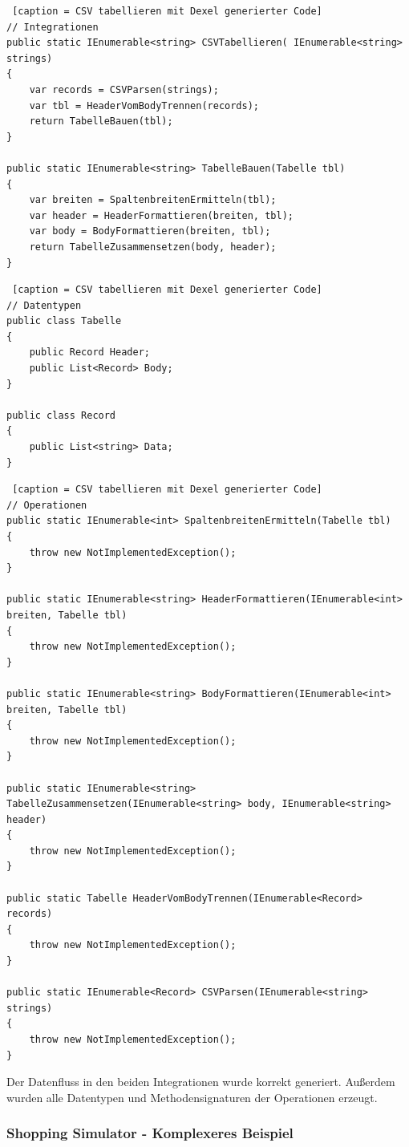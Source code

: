\begin{lstlisting} [caption = CSV tabellieren mit Dexel generierter Code]
// Integrationen
public static IEnumerable<string> CSVTabellieren( IEnumerable<string> strings)
{
	var records = CSVParsen(strings);
	var tbl = HeaderVomBodyTrennen(records);
	return TabelleBauen(tbl);
}

public static IEnumerable<string> TabelleBauen(Tabelle tbl)
{
	var breiten = SpaltenbreitenErmitteln(tbl);
	var header = HeaderFormattieren(breiten, tbl);
	var body = BodyFormattieren(breiten, tbl);
	return TabelleZusammensetzen(body, header);
}
\end{lstlisting}

\begin{lstlisting} [caption = CSV tabellieren mit Dexel generierter Code]
// Datentypen
public class Tabelle
{
	public Record Header;
	public List<Record> Body;
}

public class Record
{
	public List<string> Data;
}
\end{lstlisting}

\begin{lstlisting} [caption = CSV tabellieren mit Dexel generierter Code]
// Operationen
public static IEnumerable<int> SpaltenbreitenErmitteln(Tabelle tbl)
{
    throw new NotImplementedException();
}

public static IEnumerable<string> HeaderFormattieren(IEnumerable<int> breiten, Tabelle tbl)
{
    throw new NotImplementedException();
}

public static IEnumerable<string> BodyFormattieren(IEnumerable<int> breiten, Tabelle tbl)
{
    throw new NotImplementedException();
}

public static IEnumerable<string> TabelleZusammensetzen(IEnumerable<string> body, IEnumerable<string> header)
{
    throw new NotImplementedException();
}

public static Tabelle HeaderVomBodyTrennen(IEnumerable<Record> records)
{
    throw new NotImplementedException();
}

public static IEnumerable<Record> CSVParsen(IEnumerable<string> strings)
{
    throw new NotImplementedException();
}
\end{lstlisting}

Der Datenfluss in den beiden Integrationen wurde korrekt generiert. 
Außerdem wurden alle Datentypen und Methodensignaturen der Operationen erzeugt.

\subsubsection{Shopping Simulator - Komplexeres Beispiel}

